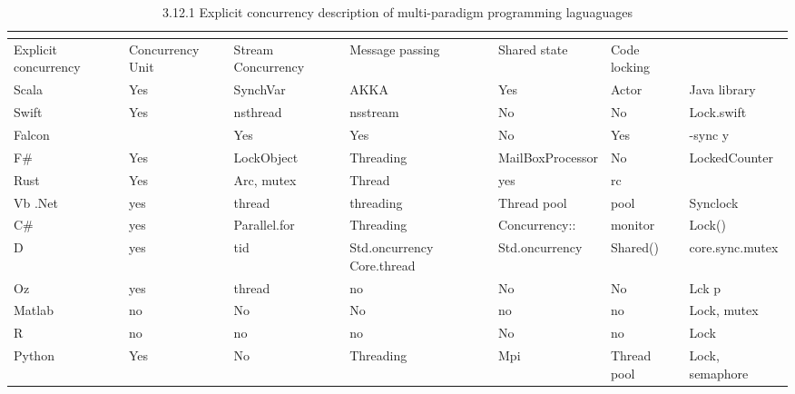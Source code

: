 \documentclass{sig-alternate}
\begin{document}
\begin{table}[]
\centering
\caption{3.12.1 Explicit concurrency description of multi-paradigm programming laguaguages}
\hline
\label{my-label}
\begin{tabular}{|l|l|l|l|l|l|l|}
\multicolumn{2}{|c|}{}                     \\ \hline
Explicit concurrency & Concurrency Unit & Stream Concurrency & Message passing            & Shared state     & Code locking &                 \\ \hline
Scala                & Yes              & SynchVar           & AKKA                       & Yes              & Actor        & Java library    \\ \hline
Swift                & Yes              & nsthread           & nsstream                   & No               & No           & Lock.swift      \\ \hline
Falcon               &                  & Yes                & Yes                        & No               & Yes          & -sync y         \\ \hline
F\#                  & Yes              & LockObject         & Threading                  & MailBoxProcessor & No           & LockedCounter   \\ \hline
Rust                 & Yes              & Arc, mutex         & Thread                     & yes              & rc           &                 \\ \hline
Vb .Net              & yes              & thread             & threading                  & Thread pool      & pool         & Synclock        \\ \hline
C\#                  & yes              & Parallel.for       & Threading                  & Concurrency::    & monitor      & Lock()          \\ \hline
D                    & yes              & tid                & Std.oncurrency Core.thread & Std.oncurrency   & Shared()     & core.sync.mutex \\ \hline
Oz                   & yes              & thread             & no                         & No               & No           & Lck p           \\ \hline
Matlab               & no               & No                 & No                         & no               & no           & Lock, mutex     \\ \hline
R                    & no               & no                 & no                         & No               & no           & Lock            \\ \hline
Python               & Yes              & No                 & Threading                  & Mpi              & Thread pool  & Lock, semaphore \\ \hline
\end{tabular}
\end{table}
\end{document}
